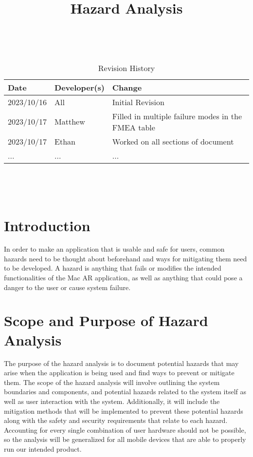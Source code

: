 \documentclass{article}
\title{Hazard Analysis\\\progname}
\author{\authname}
\date{}
\begin{document}
\maketitle
\thispagestyle{empty}

~\newpage


\begin{table}[hp]
\caption{Revision History} \label{TblRevisionHistory}
\begin{tabularx}{\textwidth}{llX}
\toprule
\textbf{Date} & \textbf{Developer(s)} & \textbf{Change}\\
\midrule
2023/10/16 & All & Initial Revision\\
2023/10/17 & Matthew & Filled in multiple failure modes in the FMEA table \\
2023/10/17 & Ethan & Worked on all sections of document \\
... & ... & ...\\
\bottomrule
\end{tabularx}
\end{table}

~\newpage

\tableofcontents

~\newpage



\section{Introduction}


In order to make an application that is usable and safe for users, common hazards need to be thought about beforehand and ways for mitigating them need to be developed. A hazard is anything that fails or modifies the intended functionalities of the Mac AR application, as well as anything that could pose a danger to the user or cause system failure.

\section{Scope and Purpose of Hazard Analysis}
The purpose of the hazard analysis is to document potential hazards that may arise when the application is being used and find ways to prevent or mitigate them. The scope of the hazard analysis will involve outlining the system boundaries and components, and potential hazards related to the system itself as well as user interaction with the system. Additionally, it will include the mitigation methods that will be implemented to prevent these potential hazards along with the safety and security requirements that relate to each hazard. Accounting for every single combination of user hardware should not be possible, so the analysis will be generalized for all mobile devices that are able to properly run our intended product.
\end{document}
